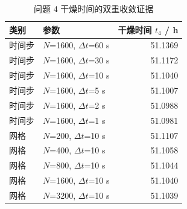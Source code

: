 \begin{table}[H]
\centering
\caption{问题 4 干燥时间的双重收敛证据}
\label{tab:conv4}
\footnotesize
\begin{tabular}{@{}llr@{}}
\toprule
类别 & 参数 & 干燥时间 $t_4$ / h \\
\midrule
时间步 & $N$=1600, $\Delta t$=60 s & 51.1369 \\
时间步 & $N$=1600, $\Delta t$=30 s & 51.1172 \\
时间步 & $N$=1600, $\Delta t$=10 s & 51.1040 \\
时间步 & $N$=1600, $\Delta t$=5 s & 51.1007 \\
时间步 & $N$=1600, $\Delta t$=2 s & 51.0988 \\
时间步 & $N$=1600, $\Delta t$=1 s & 51.0981 \\
网格 & $N$=200, $\Delta t$=10 s & 51.1107 \\
网格 & $N$=400, $\Delta t$=10 s & 51.1058 \\
网格 & $N$=800, $\Delta t$=10 s & 51.1044 \\
网格 & $N$=1600, $\Delta t$=10 s & 51.1040 \\
网格 & $N$=3200, $\Delta t$=10 s & 51.1039 \\
\bottomrule
\end{tabular}
\end{table}
